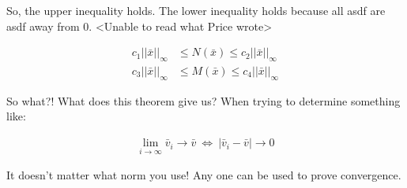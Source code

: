 So, the upper inequality holds. The lower inequality holds because all asdf are asdf away from 0. <Unable to read what Price wrote>

\begin{align*}
  c_1 ||\bar{x}||_\infty &\leq N(\bar{x}) \leq c_2 ||\bar{x}||_\infty \\
  c_3 ||\bar{x}||_\infty &\leq M(\bar{x}) \leq c_4 ||\bar{x}||_\infty
\end{align*}

So what?! What does this theorem give us? When trying to determine something like:

\begin{align*}
  \lim_{i \rightarrow \infty} \bar{v}_i \rightarrow \bar{v}\ \Leftrightarrow\ |\bar{v}_i - \bar{v}| \rightarrow 0
\end{align*}

It doesn't matter what norm you use! Any one can be used to prove convergence.